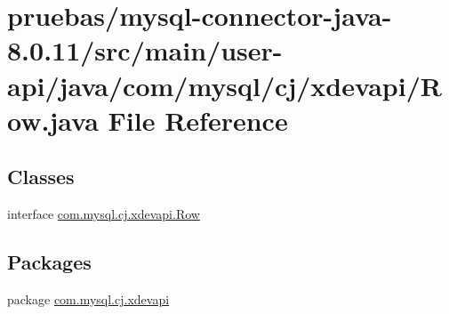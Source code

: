 \hypertarget{user-api_2java_2com_2mysql_2cj_2xdevapi_2_row_8java}{}\section{pruebas/mysql-\/connector-\/java-\/8.0.11/src/main/user-\/api/java/com/mysql/cj/xdevapi/\+Row.java File Reference}
\label{user-api_2java_2com_2mysql_2cj_2xdevapi_2_row_8java}
\subsection*{Classes}
\begin{DoxyCompactItemize}
\item 
interface \mbox{\hyperlink{interfacecom_1_1mysql_1_1cj_1_1xdevapi_1_1_row}{com.\+mysql.\+cj.\+xdevapi.\+Row}}
\end{DoxyCompactItemize}
\subsection*{Packages}
\begin{DoxyCompactItemize}
\item 
package \mbox{\hyperlink{namespacecom_1_1mysql_1_1cj_1_1xdevapi}{com.\+mysql.\+cj.\+xdevapi}}
\end{DoxyCompactItemize}
